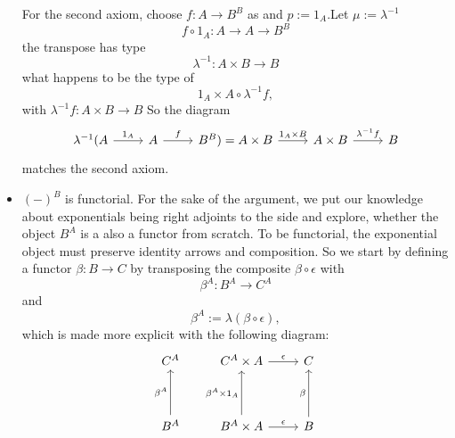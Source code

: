 \begin{itemize}
   
   For the second axiom, choose $f:A\to B^B$ as and $p:=1_A$.Let $\mu := \lambda^{-1}$
   $$f \circ 1_A : A \to A \to B^B$$
   the transpose has type
   $$\lambda^{-1}: A \times B \to B $$
   what happens to be the type of
   $$1_A \times A \circ \lambda^{-1} f,$$ with
   $\lambda^{-1}f : A\times B \to B$
   So the diagram
   \[
   \begin{tikzcd}[column sep=normal]
     \lambda^{-1}(A \arrow{r}{1_A} & A \arrow{r}{f} & B^B) = A \times B \arrow{r}{1_A \times B} & A \times B \arrow{r}{\lambda^{-1} f} & B 
   \end{tikzcd}
   \]
   matches the second axiom.

\item $ (-)^B$ is functorial.
  For the sake of the argument, we put our knowledge about exponentials being right adjoints to the side and explore, whether the object $B^A$ is a also a functor from scratch.
  To be functorial, the exponential object must preserve identity arrows and composition.
  So we start by defining a functor $\beta:B \to C$ by transposing the composite $\beta \circ \epsilon$ with
  $$ \beta^A: B^A \to C^A$$
  and
  $$ \beta^A := \lambda (\beta \circ \epsilon),$$
  which is made more explicit with the following diagram:
\[
\begin{tikzcd}[row sep=huge]
    C^A                    & C^A \times A \arrow{r}{\epsilon} & C \\
    B^A \arrow{u}{\beta^A} & B^A \times A \arrow{u}{\beta^A \times 1_A} \arrow{r}{\epsilon} & B \arrow{u}{\beta}
  \end{tikzcd}
  \]


\end{itemize}
